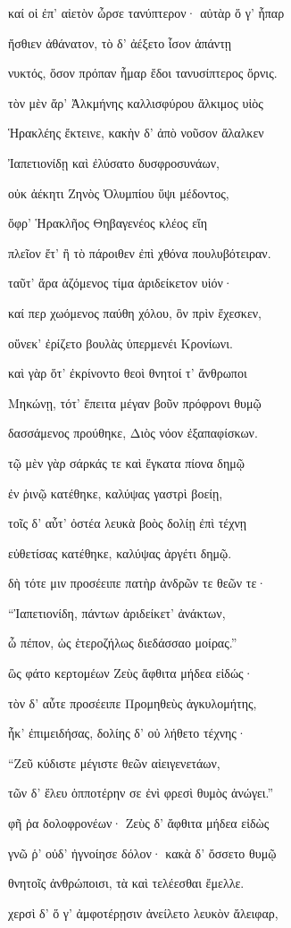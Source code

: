 \begin{pages}
\begin{Leftside}
καί οἱ ἐπ' αἰετὸν ὦρσε τανύπτερον· αὐτὰρ ὅ γ' ἧπαρ 

ἤσθιεν ἀθάνατον, τὸ δ' ἀέξετο ἶσον ἁπάντῃ 

νυκτός, ὅσον πρόπαν ἦμαρ ἔδοι τανυσίπτερος ὄρνις.  

τὸν μὲν ἄρ' Ἀλκμήνης καλλισφύρου ἄλκιμος υἱὸς

Ἡρακλέης ἔκτεινε, κακὴν δ' ἀπὸ νοῦσον ἄλαλκεν

Ἰαπετιονίδῃ καὶ ἐλύσατο δυσφροσυνάων, 

οὐκ ἀέκητι Ζηνὸς Ὀλυμπίου ὕψι μέδοντος,

ὄφρ' Ἡρακλῆος Θηβαγενέος κλέος εἴη 

πλεῖον ἔτ' ἢ τὸ πάροιθεν ἐπὶ χθόνα πουλυβότειραν.

ταῦτ' ἄρα ἁζόμενος τίμα ἀριδείκετον υἱόν·

καί περ χωόμενος παύθη χόλου, ὃν πρὶν ἔχεσκεν,

οὕνεκ' ἐρίζετο βουλὰς ὑπερμενέι Κρονίωνι.

καὶ γὰρ ὅτ' ἐκρίνοντο θεοὶ θνητοί τ' ἄνθρωποι 

Μηκώνῃ, τότ' ἔπειτα μέγαν βοῦν πρόφρονι θυμῷ

δασσάμενος προύθηκε, Διὸς νόον ἐξαπαφίσκων. 

τῷ μὲν γὰρ σάρκάς τε καὶ ἔγκατα πίονα δημῷ 

ἐν ῥινῷ κατέθηκε, καλύψας γαστρὶ βοείῃ,

τοῖς δ' αὖτ' ὀστέα λευκὰ βοὸς δολίῃ ἐπὶ τέχνῃ  

εὐθετίσας κατέθηκε, καλύψας ἀργέτι δημῷ. 

δὴ τότε μιν προσέειπε πατὴρ ἀνδρῶν τε θεῶν τε· 

``Ἰαπετιονίδη, πάντων ἀριδείκετ' ἀνάκτων, 

ὦ πέπον, ὡς ἑτεροζήλως διεδάσσαο μοίρας.'' 

ὣς φάτο κερτομέων Ζεὺς ἄφθιτα μήδεα εἰδώς·  

τὸν δ' αὖτε προσέειπε Προμηθεὺς ἀγκυλομήτης,

ἦκ' ἐπιμειδήσας, δολίης δ' οὐ λήθετο τέχνης· 

``Ζεῦ κύδιστε μέγιστε θεῶν αἰειγενετάων, 

τῶν δ' ἕλευ ὁπποτέρην σε ἐνὶ φρεσὶ θυμὸς ἀνώγει.'' 

φῆ ῥα δολοφρονέων· Ζεὺς δ' ἄφθιτα μήδεα εἰδὼς  

γνῶ ῥ' οὐδ' ἠγνοίησε δόλον· κακὰ δ' ὄσσετο θυμῷ 

θνητοῖς ἀνθρώποισι, τὰ καὶ τελέεσθαι ἔμελλε.

χερσὶ δ' ὅ γ' ἀμφοτέρῃσιν ἀνείλετο λευκὸν ἄλειφαρ, 


\end{Leftside}
\end{pages}
